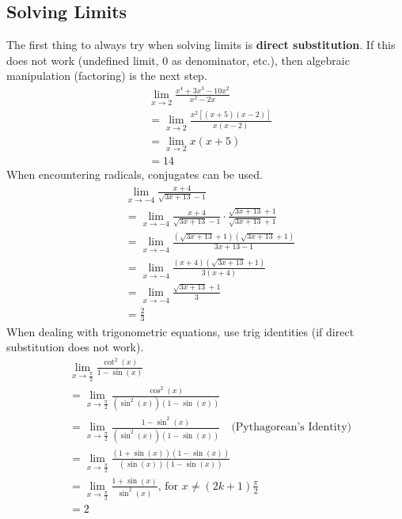 \documentclass[12pt]{article}
\begin{document}
        \subsection{Solving Limits}
            The first thing to always try when solving limits is \textbf{direct substitution}.
            If this does not work (undefined limit, 0 as denominator, etc.), then algebraic manipulation (factoring) is the next step.
            \newline
            \begin{align*}
                &\lim_{x \to 2} \frac{x^4 + 3x^3 - 10x^2}{x^2 - 2x} \\[6pt]
                &= \lim_{x \to 2} \frac{x^2\left[ (x+5)(x-2) \right]}{x(x-2)} \\
                &= \lim_{x \to 2} x(x+5) \\
                &= 14
            \end{align*}
            \newline
            When encountering radicals, conjugates can be used.
            \newline
            \begin{align*}
                &\lim_{x \to -4} \frac{x+4}{\sqrt{3x+13}-1} \\[6pt]
                &= \lim_{x \to -4} \frac{x+4}{\sqrt{3x+13}-1} \cdot \frac{\sqrt{3x+13}+1}{\sqrt{3x+13}+1} \\[6pt]
                &= \lim_{x \to -4} \frac{(\sqrt{3x+13}+1)(\sqrt{3x+13}+1)}{3x+13-1} \\[6pt]
                &= \lim_{x \to -4} \frac{(x+4)(\sqrt{3x+13}+1)}{3(x+4)} \\[6pt]
                &= \lim_{x \to -4} \frac{\sqrt{3x+13}+1}{3} \\[6pt]
                &= \frac{2}{3}
            \end{align*}
            \newline
            When dealing with trigonometric equations, use trig identities (if direct substitution does not work).
            \newline
            \begin{align*}
                &\lim_{x \to \frac{\pi}{2}} \frac{\cot^2(x)}{1-\sin(x)} \\[6pt]
                &= \lim_{x \to \frac{\pi}{2}} \frac{\cos^2(x)}{\left( \sin^2(x) \right)\left(1-\sin(x)\right)} \\[6pt]
                &= \lim_{x \to \frac{\pi}{2}} \frac{1-\sin^2(x)}{\left( \sin^2(x) \right)\left(1-\sin(x)\right)} \quad \text{(Pythagorean's Identity)} \\[6pt]
                &= \lim_{x \to \frac{\pi}{2}} \frac{\left( 1+\sin(x) \right)\left( 1-\sin(x) \right)}{\left( \sin(x) \right)\left(1-\sin(x)\right)} \\[6pt]
                &= \lim_{x \to \frac{\pi}{2}} \frac{1+\sin(x)}{\sin^2(x)} \text{, for } x \ne (2k+1)\frac{\pi}{2}\\[6pt]
                &= 2
            \end{align*}
\end{document}
